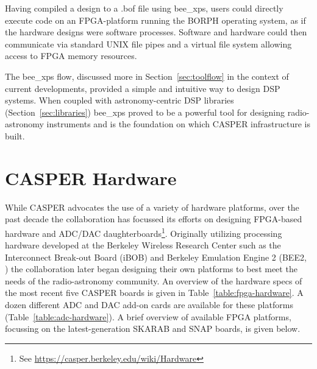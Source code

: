 \documentclass{ws-jai}
\begin{document}
Having compiled a design to a .bof file using bee\_xps, users could directly execute code on an FPGA-platform running the BORPH operating system, as if the hardware designs were software processes. Software and hardware could then communicate via standard UNIX file pipes and a virtual file system allowing access to FPGA memory resources.

The bee\_xps flow, discussed more in Section~\ref{sec:toolflow} in the context of current developments, provided a simple and intuitive way to design DSP systems. When coupled with astronomy-centric DSP libraries (Section~\ref{sec:libraries}) bee\_xps proved to be a powerful tool for designing radio-astronomy instruments and is the foundation on which CASPER infrastructure is built.

\section{CASPER Hardware} \label{sec:Hardware}

While CASPER advocates the use of a variety of hardware platforms, over the past decade the collaboration has focussed its efforts on designing FPGA-based hardware and ADC/DAC daughterboards\footnote{See \url{https://casper.berkeley.edu/wiki/Hardware}}. Originally utilizing processing hardware developed at the Berkeley Wireless Research Center such as the Interconnect Break-out Board (iBOB) and Berkeley Emulation Engine 2 (BEE2, \citet{bee2}) the collaboration later began designing their own platforms to best meet the needs of the radio-astronomy community. An overview of the hardware specs of the most recent five CASPER boards is given in Table~\ref{table:fpga-hardware}. A dozen different ADC and DAC add-on cards are available for these platforms (Table~\ref{table:adc-hardware}). A brief overview of available FPGA platforms, focussing on the latest-generation SKARAB and SNAP boards, is given below.
\end{document}
